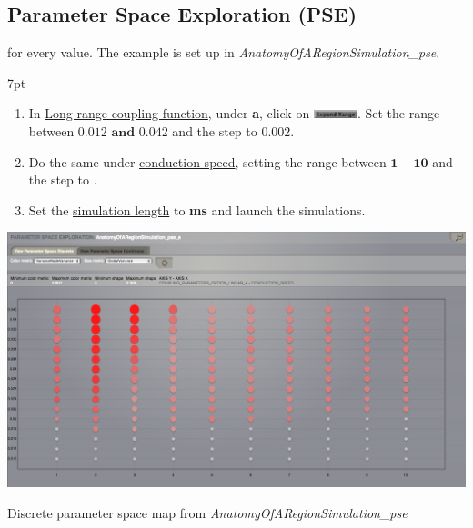 \documentclass{tufte-handout}
\newenvironment{simulation}{%
  \def\FrameCommand{%
    \hspace{1pt}%
    {\color{ForestGreen}\vrule width 2pt}%
    {\color{simulationshade}\vrule width 4pt}%
    \colorbox{simulationshade}%
  }%
  \MakeFramed{\advance\hsize-\width\FrameRestore}%
  \noindent\hspace{-4.55pt}%
  \begin{adjustwidth}{}{7pt}%
  \vspace{2pt}\vspace{2pt}%
}
{%
  \vspace{2pt}\end{adjustwidth}\endMakeFramed%
}
\begin{document}
 \newpage
\subsection{Parameter Space Exploration (PSE)}\label{sec:pse}

 for
every value.  The example is set up in \textit{AnatomyOfARegionSimulation\_pse}. 

\begin{simulation}
\begin{enumerate}
 \item In \underline{Long range coupling function}, under \textbf{a}, click on \includegraphics[width=0.1\textwidth]{butt_expand_range.png}. 
 Set the range between $\mathbf{0.012 \text{ and } 0.042}$ and the step to $\mathbf{0.002}$.
 \item Do the same under \underline{conduction speed}, setting the range between $\mathbf{1-10}$  and the step to \textbf{}.
 
 \item Set the \underline{simulation length} to \textbf{\unit[2000]{ms}} and launch the simulations.
\end{enumerate}
\end{simulation}

\begin{marginfigure}
  \includegraphics[width=\linewidth]{Handout_UI_BuildingYourOwnBrainNetworkModel_PSEDiscrete}%
  \caption{Discrete parameter space map from \textit{AnatomyOfARegionSimulation\_pse}}%
  \label{fig:pse_discrete}%
\end{marginfigure}
\end{document}
